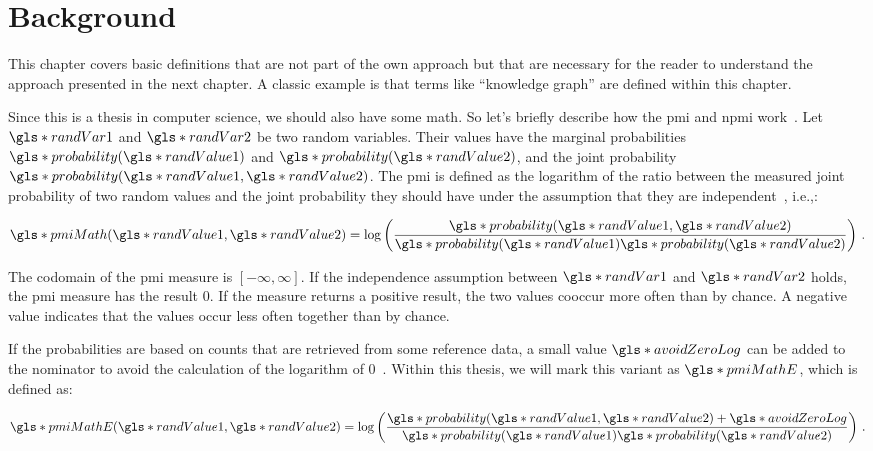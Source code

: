 \chapter{Background}
\label{ch:background}

This chapter covers basic definitions that are not part of the own approach but that are necessary for the reader to understand the approach presented in the next chapter. A classic example is that terms like ``knowledge graph'' are defined within this chapter.

Since this is a thesis in computer science, we should also have some math. So let's briefly describe how the \gls{pmi} and \gls{npmi} work~\cite{bouma2009}. Let $\s{randVar1}$ and $\s{randVar2}$ be two random variables. Their values have the marginal probabilities $\s{probability}(\s{randValue1})$ and $\s{probability}(\s{randValue2})$, and the joint probability $\s{probability}(\s{randValue1},\s{randValue2})$. The \gls{pmi} is defined as the logarithm of the ratio between the measured joint probability of two random values and the joint probability they should have under the assumption that they are independent~\cite{bouma2009}, i.e.,:

\begin{equation}
\label{eq:pmi}
\s{pmiMath}(\s{randValue1},\s{randValue2}) = \log\left(\frac{\s{probability}(\s{randValue1},\s{randValue2})}{\s{probability}(\s{randValue1})\s{probability}(\s{randValue2})}\right)\,.
\end{equation}

The codomain of the \gls{pmi} measure is $[-\infty,\infty]$. If the independence assumption between $\s{randVar1}$ and $\s{randVar2}$ holds, the \gls{pmi} measure has the result $0$. If the measure returns a positive result, the two values cooccur more often than by chance. A negative value indicates that the values occur less often together than by chance. 

If the probabilities are based on counts that are retrieved from some reference data, a small value $\s{avoidZeroLog}$ can be added to the nominator to avoid the calculation of the logarithm of 0~\cite{stevens2012}. Within this thesis, we will mark this variant as $\s{pmiMathE}$, which is defined as:

\begin{equation}
\label{eq:pmi-e}
\s{pmiMathE}(\s{randValue1},\s{randValue2}) = \log\left(\frac{\s{probability}(\s{randValue1},\s{randValue2})+\s{avoidZeroLog}}{\s{probability}(\s{randValue1})\s{probability}(\s{randValue2})}\right)\,.
\end{equation}

